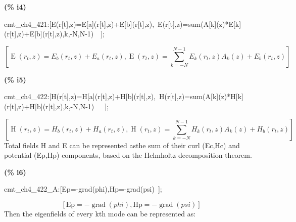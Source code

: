\documentclass[fleqn]{article}
\begin{document}
\noindent
\begin{minipage}[t]{4.000000em}\color{red}\bfseries
(\% i4)	
\end{minipage}
\begin{minipage}[t]{\textwidth}\color{blue}
cmt\_ch4\_421:[E(r[t],z)=E[a](r[t],z)+E[b](r[t],z),\ E(r[t],z)=sum(A[k](z)*E[k](r[t],z)+E[b](r[t],z),k,-N,N-1)\ \ ];
\end{minipage}
\[\displaystyle \tag{\% o4} 
\left[ \operatorname{E}\left( {r_t}\operatorname{,}z\right) ={E_b}\left( {r_t}\operatorname{,}z\right) +{E_a}\left( {r_t}\operatorname{,}z\right) \operatorname{,}\operatorname{E}\left( {r_t}\operatorname{,}z\right) =\sum_{k=-N}^{N-1}{\left. {E_k}\left( {r_t}\operatorname{,}z\right)  {A_k}(z)+{E_b}\left( {r_t}\operatorname{,}z\right) \right.}\right] \mbox{}
\]


\noindent
\begin{minipage}[t]{4.000000em}\color{red}\bfseries
(\% i5)	
\end{minipage}
\begin{minipage}[t]{\textwidth}\color{blue}
cmt\_ch4\_422:[H(r[t],z)=H[a](r[t],z)+H[b](r[t],z),\ H(r[t],z)=sum(A[k](z)*H[k](r[t],z)+H[b](r[t],z),k,-N,N-1)\ \ \ ];
\end{minipage}
\[\displaystyle \tag{\% o5} 
\left[ \operatorname{H}\left( {r_t}\operatorname{,}z\right) ={H_b}\left( {r_t}\operatorname{,}z\right) +{H_a}\left( {r_t}\operatorname{,}z\right) \operatorname{,}\operatorname{H}\left( {r_t}\operatorname{,}z\right) =\sum_{k=-N}^{N-1}{\left. {H_k}\left( {r_t}\operatorname{,}z\right)  {A_k}(z)+{H_b}\left( {r_t}\operatorname{,}z\right) \right.}\right] \mbox{}
\]
Total fields H and E can be represented asthe sum of their curl (Ec,Hc) and potential (Ep,Hp) components, based on the Helmholtz decomposition theorem.


\noindent
\begin{minipage}[t]{4.000000em}\color{red}\bfseries
(\% i6)	
\end{minipage}
\begin{minipage}[t]{\textwidth}\color{blue}
cmt\_ch4\_422\_A:[Ep=-grad(phi),Hp=-grad(psi)\ ];
\end{minipage}
\[\displaystyle \tag{\% o6} 
\left[ \ensuremath{\mathrm{Ep}}=-\operatorname{grad}(phi)\operatorname{,}\ensuremath{\mathrm{Hp}}=-\operatorname{grad}(psi)\right] \mbox{}
\]
Then the eigenfields of every kth mode can be represented as:
\end{document}
